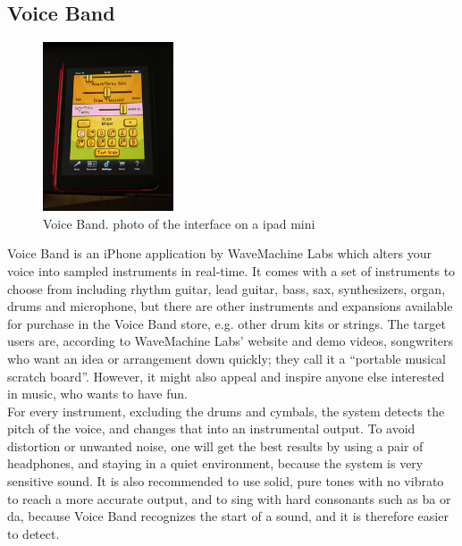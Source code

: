 \subsection{ Voice Band }
\begin{figure}[h]
	\begin{center}
		\includegraphics[height=5cm]{fig/voiceband.png}
		\caption{Voice Band. photo of the interface on a ipad mini}
		\label{VoiceBand}
	\end{center}
\end{figure}

Voice Band is an iPhone application by WaveMachine Labs which alters your voice into sampled instruments in real-time. It comes with a set of instruments to choose from including rhythm guitar, lead guitar, bass, sax, synthesizers, organ, drums and microphone, but there are other instruments and expansions available for purchase in the Voice Band store, e.g. other drum kits or strings. The target users are, according to WaveMachine Labs’ website and demo videos, songwriters who want an idea or arrangement down quickly; they call it a “portable musical scratch board”. However, it might also appeal and inspire anyone else interested in music, who wants to have fun. \\

For every instrument, excluding the drums and cymbals, the system detects the pitch of the voice, and changes that into an instrumental output. To avoid distortion or unwanted noise, one will get the best results by using a pair of headphones, and staying in a quiet environment, because the system is very sensitive sound. It is also recommended to use solid, pure tones with no vibrato to reach a more accurate output, and to sing with hard consonants such as ba or da, because Voice Band recognizes the start of a sound, and it is therefore easier to detect.  \\

